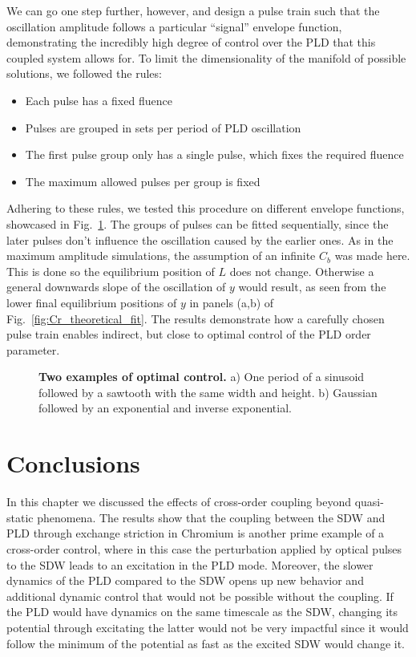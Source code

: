 We can go one step further, however, and design a pulse train such that the oscillation amplitude follows a particular ``signal'' envelope function, demonstrating the incredibly high degree of control over the PLD that this coupled system allows for.  
To limit the dimensionality of the manifold of possible solutions, we followed the rules:
\begin{itemize}
	\item Each pulse has a fixed fluence
	\item Pulses are grouped in sets per period of PLD oscillation
	\item The first pulse group only has a single pulse, which fixes the required fluence
	\item The maximum allowed pulses per group is fixed
\end{itemize}
Adhering to these rules, we tested this procedure on different envelope functions, showcased in Fig.~\ref{fig:Cr_control}.
The groups of pulses can be fitted sequentially, since the later pulses don't influence the oscillation caused by the earlier ones.
As in the maximum amplitude simulations, the assumption of an infinite $C_b$ was made here.
This is done so the equilibrium position of $L$ does not change.
Otherwise a general downwards slope of the oscillation of $y$ would result, as seen from the lower final equilibrium positions of $y$ in panels (a,b) of Fig.~\ref{fig:Cr_theoretical_fit}.
The results demonstrate how a carefully chosen pulse train enables indirect, but close to optimal control of the PLD order parameter.
\begin{figure}
	\caption{\label{fig:Cr_control} {\bf Two examples of optimal control.} a) One period of a sinusoid followed by a sawtooth with the same width and height. b) Gaussian followed by an exponential and inverse exponential.}
\end{figure}

\section{Conclusions}
In this chapter we discussed the effects of cross-order coupling beyond quasi-static phenomena.
The results show that the coupling between the SDW and PLD through exchange striction in Chromium is another prime example of a cross-order control, where in this case the perturbation applied by optical pulses to the SDW leads to an excitation in the PLD mode.
Moreover, the slower dynamics of the PLD compared to the SDW opens up new behavior and additional dynamic control that would not be possible without the coupling.
If the PLD would have dynamics on the same timescale as the SDW, changing its potential through excitating the latter would not be very impactful since it would follow the minimum of the potential as fast as the excited SDW would change it.

